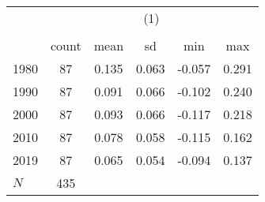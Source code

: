 {
\def\sym#1{\ifmmode^{#1}\else\(^{#1}\)\fi}
\begin{tabular}{l*{1}{ccccc}}
\toprule
            &\multicolumn{5}{c}{(1)}                                         \\
            &\multicolumn{5}{c}{}                                            \\
            &       count&        mean&          sd&         min&         max\\
\midrule
1980        &          87&       0.135&       0.063&      -0.057&       0.291\\
1990        &          87&       0.091&       0.066&      -0.102&       0.240\\
2000        &          87&       0.093&       0.066&      -0.117&       0.218\\
2010        &          87&       0.078&       0.058&      -0.115&       0.162\\
2019        &          87&       0.065&       0.054&      -0.094&       0.137\\
\midrule
\(N\)       &         435&            &            &            &            \\
\bottomrule
\end{tabular}
}
